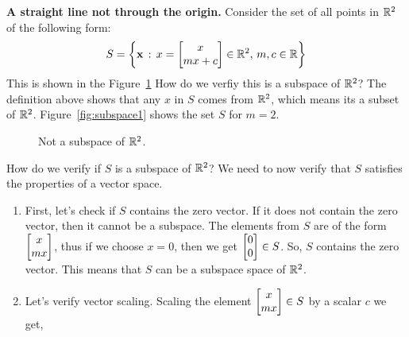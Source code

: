 \begin{example}
    \textbf{A straight line not through the origin.} Consider the set of all points in $\mathbb{R}^2$ of the following form:
    \[ S = \lc \mf{x} \, : \, x = \bmxc x \\ m x + c \emx \in \mb{R}^2, \, m, c \in \mb{R} \rc \]
    This is shown in the Figure~\ref{fig:subspace2}
    How do we verfiy this is a subspace of $\mathbb{R}^2$? The definition above shows that any $x$ in $S$ comes from $\mathbb{R}^2$, which means its a subset of $\mathbb{R}^2$. Figure~\ref{fig:subspace1} shows the set $S$ for $m = 2$.
    \begin{figure}[h!]
    \centering
    \caption{Not a subspace of $\mathbb{R}^2$.}
    \label{fig:subspace2}
    \end{figure}
    \noindent How do we verify if $S$ is a subspace of $\mathbb{R}^2$? We need to now verify that $S$ satisfies the properties of a vector space.
    \begin{enumerate}
        \item First, let's check if $S$ contains the zero vector. If it does not contain the zero vector, then it cannot be a subspace. The elements from $S$ are of the form $\bmxc x \\ m x\emx$, thus if we choose $x = 0$, then we get $\bmx 0 \\ 0 \emx \in S$. So, $S$ contains the zero vector. This means that $S$ can be a subspace space of $\mathbb{R}^2$.
        \item Let's verify vector scaling. Scaling the element $\bmxc x \\ m x \emx \in S$ by a scalar $c$ we get,

\end{enumerate}
\end{example}
